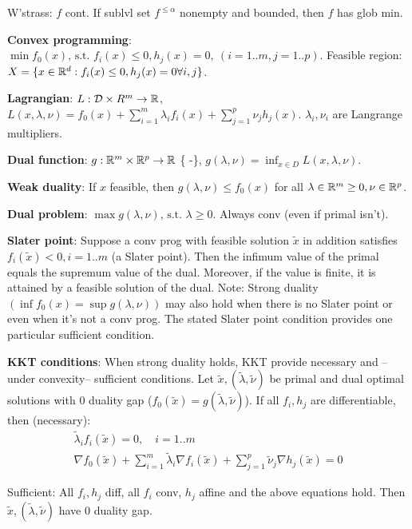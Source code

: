 

W'strass: $f$ cont. If sublvl set $f^{\leq \alpha}$ nonempty and bounded, then $f$ has glob min.


 \textbf{Convex programming}: $\min f_0 (x)\text{, s.t. } f_i(x) \leq 0, h_j (x) = 0, \ (i = 1..m, j=1..p)$. Feasible region: $X = \{ x \in \mathbb{R}^d : f_i(x) \leq 0, h_j(x) = 0 \forall i,j \}$.

 \textbf{Lagrangian}: $ L : \mathcal{D} \times R^m \to \mathbb{R}$, $L(x, \lambda, \nu) = f_0 (x) + \sum_{i=1}^{m} \lambda_i f_i(x) + \sum_{j=1}^{p} \nu_j h_j(x)$. $\lambda_i, \nu_i$ are Langrange multipliers.

 \textbf{Dual function}: $g : \mathbb{R}^m \times \mathbb{R}^p \to \mathbb{R}$ \cup \{ -\infty \}, $g(\lambda, \nu) = \inf_{x \in D} L(x, \lambda, \nu)$.

 \textbf{Weak duality}: If $x$ feasible, then $g(\lambda, \nu) \leq f_0(x)$ for all $\lambda \in \mathbb{R}^m \geq 0, \nu \in \mathbb{R}^p$.

\textbf{Dual problem}: $\max g(\lambda, \nu)\text{, s.t. } \lambda \geq 0$. Always conv (even if primal isn't).

\textbf{Slater point}: Suppose a conv prog with feasible solution $\tilde{x}$ in addition satisfies $f_i(\tilde{x}) < 0, i=1..m$ (a Slater point). Then the infimum value of the primal equals the supremum value of the dual. Moreover, if the value is finite, it is attained by a feasible solution of the dual. Note: Strong duality $(\inf f_0 (x) = \sup g(\lambda, \nu))$ may also hold when there is no Slater point or even when it's not a conv prog. The stated Slater point condition provides one particular sufficient condition.

\textbf{KKT conditions}: When strong duality holds, KKT provide necessary and --under convexity-- sufficient conditions. Let $\tilde{x}, (\tilde{\lambda}, \tilde{\nu})$ be primal and dual optimal solutions with 0 duality gap ($f_0(\tilde{x}) = g(\tilde{\lambda}, \tilde{\nu})$). If all $f_i, h_j$ are differentiable, then (necessary):
\begin{align*}
    \tilde{\lambda}_i f_i(\tilde{x}) = 0, \quad i=1..m \\
    \nabla f_0(\tilde{x}) + \sum_{i=1}^{m} \tilde{\lambda}_i \nabla f_i(\tilde{x}) + \sum_{j=1}^{p} \tilde{\nu}_j \nabla h_j(\tilde{x}) = 0
\end{align*}

Sufficient: All $f_i, h_j$ diff, all $f_i$ conv, $h_j$ affine and the above equations hold. Then $\tilde{x}, (\tilde{\lambda}, \tilde{\nu})$ have 0 duality gap.